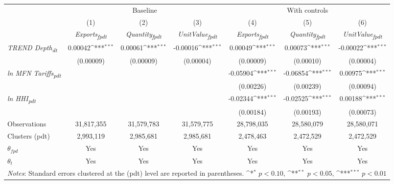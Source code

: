 {
\def\sym#1{\ifmmode^{#1}\else\(^{#1}\)\fi}
\begin{tabular}{l*{6}{c}}
\toprule
                &\multicolumn{3}{c}{Baseline}                            &\multicolumn{3}{c}{With controls}                       \\\cmidrule(lr){2-4}\cmidrule(lr){5-7}
                &\multicolumn{1}{c}{(1)}&\multicolumn{1}{c}{(2)}&\multicolumn{1}{c}{(3)}&\multicolumn{1}{c}{(4)}&\multicolumn{1}{c}{(5)}&\multicolumn{1}{c}{(6)}\\
                &\multicolumn{1}{c}{\textit{Exports\textsubscript{fpdt}}}&\multicolumn{1}{c}{\textit{Quantity\textsubscript{fpdt}}}&\multicolumn{1}{c}{\textit{UnitValue\textsubscript{fpdt}}}&\multicolumn{1}{c}{\textit{Exports\textsubscript{fpdt}}}&\multicolumn{1}{c}{\textit{Quantity\textsubscript{fpdt}}}&\multicolumn{1}{c}{\textit{UnitValue\textsubscript{fpdt}}}\\
\midrule
\textit{TREND Depth\textsubscript{dt}}&  0.00042\sym{***}&  0.00061\sym{***}& -0.00016\sym{***}&  0.00049\sym{***}&  0.00073\sym{***}& -0.00022\sym{***}\\
                &(0.00009)         &(0.00009)         &(0.00004)         &(0.00009)         &(0.00010)         &(0.00004)         \\
\addlinespace
\textit{ln MFN Tariffs\textsubscript{pdt}}&                  &                  &                  & -0.05904\sym{***}& -0.06854\sym{***}&  0.00975\sym{***}\\
                &                  &                  &                  &(0.00226)         &(0.00239)         &(0.00094)         \\
\addlinespace
\textit{ln HHI\textsubscript{pdt}}&                  &                  &                  & -0.02344\sym{***}& -0.02525\sym{***}&  0.00188\sym{***}\\
                &                  &                  &                  &(0.00184)         &(0.00193)         &(0.00073)         \\
\midrule
Observations    &31,817,355         &31,579,783         &31,579,775         &28,798,035         &28,580,079         &28,580,071         \\
Clusters (pdt)  &2,993,119         &2,985,681         &2,985,681         &2,478,463         &2,472,529         &2,472,529         \\
$\theta_{fpd}$  &      Yes         &      Yes         &      Yes         &      Yes         &      Yes         &      Yes         \\
$\theta_t$      &      Yes         &      Yes         &      Yes         &      Yes         &      Yes         &      Yes         \\
\bottomrule
\multicolumn{7}{l}{\footnotesize \textit{Notes}: Standard errors clustered at the (pdt) level are reported in parentheses. \sym{*} \(p<0.10\), \sym{**} \(p<0.05\), \sym{***} \(p<0.01\)}\\
\end{tabular}
}
